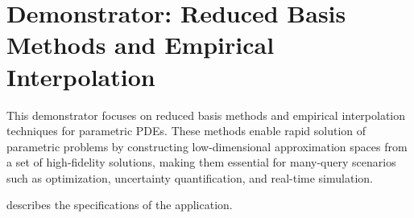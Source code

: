 
\section{Demonstrator: Reduced Basis Methods and Empirical Interpolation}
\label{sec:app:specs:app-feelpp-rb}

This demonstrator focuses on reduced basis methods and empirical interpolation techniques for parametric PDEs. These methods enable rapid solution of parametric problems by constructing low-dimensional approximation spaces from a set of high-fidelity solutions, making them essential for many-query scenarios such as optimization, uncertainty quantification, and real-time simulation.

 describes the specifications of the application.

